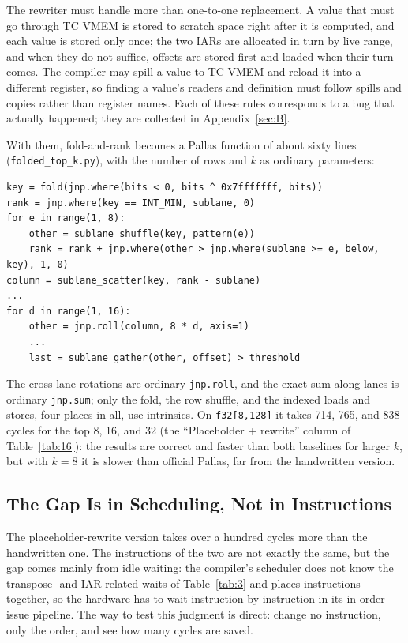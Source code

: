 \documentclass[sigconf,nonacm,balance=false]{acmart}
\newcommand{\code}[1]{\texttt{#1}}
\begin{document}
The rewriter must handle more than one-to-one replacement. A value that must go through TC VMEM is stored to scratch space right after it is computed, and each value is stored only once; the two IARs are allocated in turn by live range, and when they do not suffice, offsets are stored first and loaded when their turn comes. The compiler may spill a value to TC VMEM and reload it into a different register, so finding a value's readers and definition must follow spills and copies rather than register names. Each of these rules corresponds to a bug that actually happened; they are collected in Appendix~\ref{sec:B}.

With them, fold-and-rank becomes a Pallas function of about sixty lines (\code{folded\_\allowbreak{}top\_\allowbreak{}k.\allowbreak{}py}), with the number of rows and $k$ as ordinary parameters:

\begin{lstlisting}
key = fold(jnp.where(bits < 0, bits ^ 0x7fffffff, bits))
rank = jnp.where(key == INT_MIN, sublane, 0)
for e in range(1, 8):
    other = sublane_shuffle(key, pattern(e))
    rank = rank + jnp.where(other > jnp.where(sublane >= e, below, key), 1, 0)
column = sublane_scatter(key, rank - sublane)
...
for d in range(1, 16):
    other = jnp.roll(column, 8 * d, axis=1)
    ...
    last = sublane_gather(other, offset) > threshold
\end{lstlisting}
The cross-lane rotations are ordinary \code{jnp.\allowbreak{}roll}, and the exact sum along lanes is ordinary \code{jnp.\allowbreak{}sum}; only the fold, the row shuffle, and the indexed loads and stores, four places in all, use intrinsics. On \code{f32[8,\allowbreak{}128]} it takes 714, 765, and 838 cycles for the top 8, 16, and 32 (the ``Placeholder + rewrite'' column of Table~\ref{tab:16}): the results are correct and faster than both baselines for larger $k$, but with $k = 8$ it is slower than official Pallas, far from the handwritten version.

\subsection{The Gap Is in Scheduling, Not in Instructions}
\label{sec:7.2}

The placeholder-rewrite version takes over a hundred cycles more than the handwritten one. The instructions of the two are not exactly the same, but the gap comes mainly from idle waiting: the compiler's scheduler does not know the transpose- and IAR-related waits of Table~\ref{tab:3} and places instructions together, so the hardware has to wait instruction by instruction in its in-order issue pipeline. The way to test this judgment is direct: change no instruction, only the order, and see how many cycles are saved.
\end{document}
